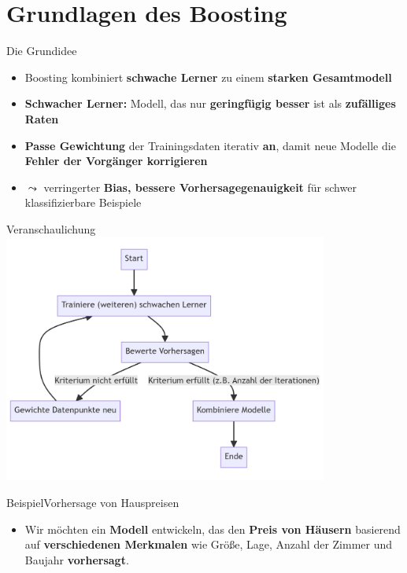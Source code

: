 \documentclass[hyperref={bookmarks=false},11pt,dvipsnames]{beamer}
\begin{document}
\section{Grundlagen des Boosting}
\begin{frame}[t]{Die Grundidee}
	\begin{itemize}
		\item <1-> Boosting kombiniert \textbf{schwache Lerner} zu einem \textbf{starken Gesamtmodell}
		\item <2-> \textbf{Schwacher Lerner:} Modell, das nur \textbf{geringfügig besser} ist als \textbf{zufälliges Raten}
		\item <3-> \textbf{Passe Gewichtung} der Trainingsdaten iterativ \textbf{an}, damit neue Modelle die \textbf{Fehler der Vorgänger korrigieren}
		\item <4-> $\leadsto$ verringerter \textbf{Bias, bessere Vorhersagegenauigkeit} für schwer klassifizierbare Beispiele
	\end{itemize}
\end{frame}

\begin{frame}[t]{Veranschaulichung}
	\centering
	\includegraphics[width=0.8\textwidth]{../Ausarbeitung/figures/Boosting_Graph.png}
\end{frame}
\begin{frame}[t]{Beispiel}{Vorhersage von Hauspreisen}
	\begin{itemize}
		\item <1-> Wir möchten ein \textbf{Modell} entwickeln, das den \textbf{Preis von
			      Häusern} basierend auf \textbf{verschiedenen Merkmalen} wie Größe, Lage, Anzahl der
		      Zimmer und Baujahr \textbf{vorhersagt}.
	\end{itemize}
	\begin{table}
		\centering
		\resizebox{\textwidth}{!}{%
			
		}
	\end{table}


\end{frame}
\end{document}
